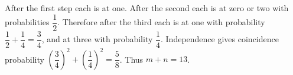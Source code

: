 After the first step each is at one. After the second each is at zero or two with probabilities $\dfrac{1}{2}$. Therefore after the third each is at one with probability $\dfrac{1}{2}+\dfrac{1}{4}=\dfrac{3}{4}$, and at three with probability $\dfrac{1}{4}$. Independence gives coincidence probability $(\dfrac{3}{4})^2+(\dfrac{1}{4})^2=\dfrac{5}{8}$. Thus $\boxed{m+n=13}$.
